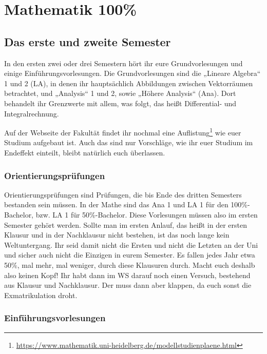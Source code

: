 \section{Mathematik 100\%}

\subsection{Das erste und zweite Semester}

In den ersten zwei oder drei Semestern hört ihr eure Grundvorlesungen und einige Einführungsvorlesungen. Die Grundvorlesungen sind die „Lineare Algebra“ 1 und 2 (\gls{LA}), in denen ihr hauptsächlich Abbildungen zwischen Vektorräumen betrachtet, und „Analysis“ 1 und 2, sowie „Höhere Analysis“ (\gls{Ana}). Dort behandelt ihr Grenzwerte mit allem, was folgt, das heißt Differential- und Integralrechnung.

Auf der Webseite der Fakultät findet ihr nochmal eine Auflistung\footnote{\url{https://www.mathematik.uni-heidelberg.de/modellstudienplaene.html}} wie euer Studium aufgebaut ist. Auch das sind nur Vorschläge, wie ihr euer Studium im Endeffekt einteilt, bleibt natürlich euch überlassen.

\subsubsection{Orientierungsprüfungen}

Orientierungsprüfungen sind Prüfungen, die bis Ende des dritten Semesters bestanden sein müssen. In der Mathe sind das Ana 1 und LA 1 für den 100\%-Bachelor, bzw. LA 1 für 50\%-Bachelor. Diese Vorlesungen müssen also im ersten Semester gehört werden. Sollte man im ersten Anlauf, das heißt in der ersten Klausur und in der Nachklausur nicht bestehen, ist das noch lange kein Weltuntergang. Ihr seid damit nicht die Ersten und nicht die Letzten an der Uni und sicher auch nicht die Einzigen in eurem Semester. Es fallen jedes Jahr etwa 50\%, mal mehr, mal weniger, durch diese Klausuren durch. Macht euch deshalb also keinen Kopf! Ihr habt dann im WS darauf noch einen Versuch, bestehend aus Klausur und Nachklausur. Der muss dann aber klappen, da euch sonst die Exmatrikulation droht.

\subsubsection{Einführungsvorlesungen}

